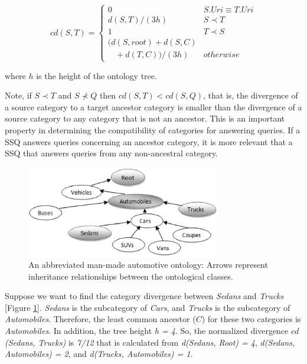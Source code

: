 \begin{equation}
cd(S, T) = \begin{cases}
0 & S.{Uri} \equiv T.{Uri}\\
d(S, T)/(3h) & S \prec T\\
1 & T \prec S\\
(d(S,root) + d(S,C) \\ \ \ \ \ + d(T,C))/(3h) & otherwise
\end{cases}
\end{equation}

\noindent where $h$ is the height of the ontology tree.

Note, if $S \prec T$ and $S \not\prec Q$ then $cd(S,T) <
cd(S,Q)$, that is, the divergence of a source category to a target
ancestor category is smaller than the divergence of a source category to any
category that is not an ancestor. This is an important property in
determining the compatibility of categories for answering queries.  If a
SSQ answers queries concerning an ancestor category, it is more relevant
that a SSQ that answers queries from any non-ancestral category.

\begin{figure}[t]
\centering
\includegraphics[width=85mm]{img/automotive_ontology.eps}
\caption{An abbreviated man-made automotive ontology: Arrows represent inheritance relationships between the ontological classes.}
\label{fig:automotive_ontology}
\end{figure}

Suppose we want to find the category divergence between \textit{Sedans}
and \textit{Trucks} [Figure \ref{fig:automotive_ontology}]. 
\textit{Sedans} is the subcategory of \textit{Cars}, and \textit{Trucks}
is the subcategory of \textit{Automobiles}. Therefore, the least common ancestor ($C$)
for these two categories is \textit{Automobiles}. In addition, the tree height \textit{h = 4}.
So, the normalized divergence $cd$\textit{(Sedans, Trucks)} is \textit{7/12}
that is calculated from \textit{d(Sedans, Root) = 4}, \textit{d(Sedans, Automobiles) = 2}, and \textit{d(Trucks, Automobiles) = 1}.



